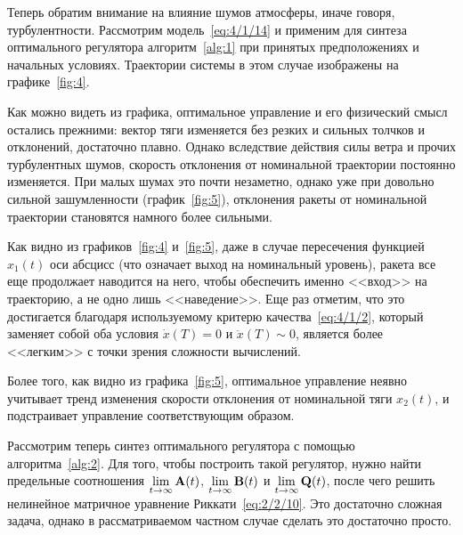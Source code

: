 \br

Теперь обратим внимание на влияние шумов атмосферы, иначе говоря, турбулентности. Рассмотрим модель~\ref{eq:4/1/14} и применим для синтеза оптимального регулятора алгоритм~\ref{alg:1} при принятых предположениях и начальных условиях. Траектории системы в этом случае изображены на графике~\ref{fig:4}.


Как можно видеть из графика, оптимальное управление и его физический смысл остались прежними: вектор тяги изменяется без резких и сильных толчков и отклонений, достаточно плавно. Однако вследствие действия силы ветра и прочих турбулентных шумов, скорость отклонения от номинальной траектории постоянно изменяется. При малых шумах это почти незаметно, однако уже при довольно сильной зашумленности (график~\ref{fig:5}), отклонения ракеты от номинальной траектории становятся намного более сильными.


Как видно из графиков~\ref{fig:4} и~\ref{fig:5}, даже в случае пересечения функцией $x_1(t)$ оси абсцисс (что означает выход на номинальный уровень), ракета все еще продолжает наводится на него, чтобы обеспечить именно <<вход>> на траекторию, а не одно лишь <<наведение>>. Еще раз отметим, что это достигается благодаря используемому критерю качества~\vref{eq:4/1/2}, который заменяет собой оба условия $\dot{x}(T)=0$ и $\ddot{x}(T) \sim 0$, является более <<легким>> с точки зрения сложности вычислений.

Более того, как видно из графика~\ref{fig:5}, оптимальное управление неявно учитывает тренд изменения скорости отклонения от номинальной тяги $x_2(t)$, и подстраивает управление соответствующим образом.

\br

Рассмотрим теперь синтез оптимального регулятора с помощью алгоритма~\vref{alg:2}. Для того, чтобы построить такой регулятор, нужно найти предельные соотношения $\lim\limits_{t \to \infty} \mathbf{A}(t)$, $\lim\limits_{t \to \infty} \mathbf{B}(t)$ и $\lim\limits_{t \to \infty} \mathbf{Q}(t)$, после чего решить нелинейное матричное уравнение Риккати~\vref{eq:2/2/10}. Это достаточно сложная задача, однако в рассматриваемом частном случае сделать это достаточно просто.


